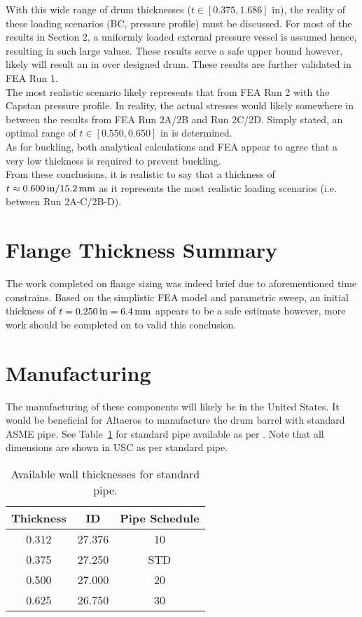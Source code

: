 With this wide range of drum thicknesses ($t\in[0.375,1.686]$ in), the reality of these loading scenarios (BC, pressure profile) must be discussed. For most of the results in Section 2, a uniformly loaded external pressure vessel is assumed hence, resulting in such large values. These results serve a safe upper bound however, likely will result an in over designed drum. These results are further validated in FEA Run 1.\\

The most realistic scenario likely represents that from FEA Run 2 with the Capstan pressure profile. In reality, the actual stresses would likely somewhere in between the results from FEA Run 2A/2B and Run 2C/2D. Simply stated, an optimal range of $t\in[0.550,0.650]$ in is determined.\\

As for buckling, both analytical calculations and FEA appear to agree that a very low thickness is required to prevent buckling. \\

From these conclusions, it is realistic to say that a thickness of $t \approx 0.600\,\mathrm{in} /\/ 15.2\,\mathrm{mm}$ as it represents the most realistic loading scenarios (i.e. between Run 2A-C/2B-D). 

\section{Flange Thickness Summary}

The work completed on flange sizing was indeed brief due to aforementioned time constrains. Based on the simplistic FEA model and parametric sweep, an initial thickness of $t=0.250\,\mathrm{in}=6.4\,\mathrm{mm}$ appears to be a safe estimate however, more work should be completed on to valid this conclusion.

\section{Manufacturing}

The manufacturing of these components will likely be in the United States. It would be beneficial for Altaeros to manufacture the drum barrel with standard ASME pipe. See Table~\ref{table:5_pipe} for standard pipe available as per \cite{PIPEINFO}. Note that all dimensions are shown in USC as per standard pipe.

\begin{table}[H]
	\caption[Available wall thicknesses for standard pipe.]{Available wall thicknesses for standard pipe.\protect\cite{PIPEINFO}}
	\centering
	\begin{tabular}{ccc}
    \textbf{Thickness} & \textbf{ID} & \textbf{Pipe Schedule} \\
    \midrule
    0.312 & 27.376 & 10 \\
    0.375 & 27.250 & STD \\
    0.500 & 27.000 & 20 \\
    0.625 & 26.750 & 30 \\
    \end{tabular}%
	\label{table:5_pipe}
\end{table}

